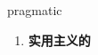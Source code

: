 
\begin{frame}
{\huge pragmatic}
\begin{center}
\begin{enumerate}\Large
  \item \textbf{实用主义的}
\end{enumerate}
\end{center}
\end{frame}
